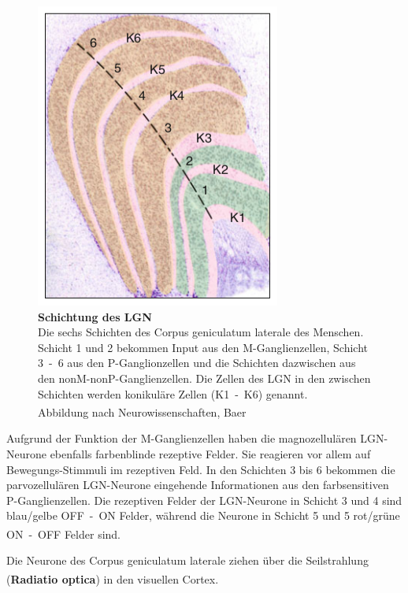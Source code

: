 \documentclass[12pt,a4paper,pdftex]{article}
\begin{document}
\begin{figure}[H]
    \centering
    \includegraphics{pictures/visual/LGN_baer.png}
    \caption[Schichtung des LGN]{\textbf{Schichtung des LGN}\\
    Die sechs Schichten des Corpus geniculatum laterale des Menschen. Schicht 1 und 2 bekommen Input aus den M-Ganglienzellen, Schicht 3~-~6 aus den P-Ganglionzellen und die Schichten dazwischen aus den nonM-nonP-Ganglienzellen. Die Zellen des LGN in den zwischen Schichten werden konikuläre Zellen (K1~-~K6) genannt.\\
    Abbildung nach Neurowissenschaften, Baer \textsuperscript{\cite[10]{neurowissenschaften_baer}}}
    \label{fig:schichtung-LGN}
\end{figure} 

Aufgrund der Funktion der M-Ganglienzellen haben die magnozellulären LGN-Neurone ebenfalls farbenblinde rezeptive Felder. Sie reagieren vor allem auf Bewegungs-Stimmuli im rezeptiven Feld. In den Schichten 3 bis 6 bekommen die parvozellulären LGN-Neurone eingehende Informationen aus den farbsensitiven P-Ganglienzellen. Die rezeptiven Felder der LGN-Neurone in Schicht 3 und 4 sind blau/gelbe OFF~-~ON Felder, während die Neurone in Schicht 5 und 5 rot/grüne ON~-~OFF Felder sind. \textsuperscript{\cite[18]{smith2008biology}}

Die Neurone des Corpus geniculatum laterale ziehen über die Seilstrahlung (\textbf{Radiatio optica})  in den visuellen Cortex. \textsuperscript{\cite[8.1]{trepel2011neuroanatomie}}
\end{document}
